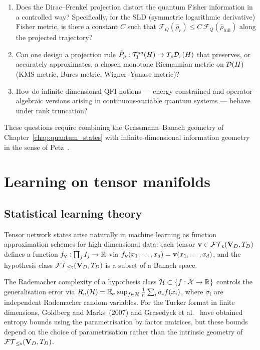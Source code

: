 \begin{problem}
\label{prob:lind:qfi}
\begin{enumerate}
\item[\textup{(a)}] Does the Dirac--Frenkel projection distort the
    quantum Fisher information in a controlled way? Specifically, for
    the SLD (symmetric logarithmic derivative) Fisher metric, is there
    a constant $C$ such that
    $\mathcal{F}_Q(\hat\rho_r) \leq C\,\mathcal{F}_Q(\hat\rho_{\mathrm{full}})$
    along the projected trajectory?
\item[\textup{(b)}] Can one design a projection rule
    $\hat P_\rho: \mathcal{T}_{1}^{sa}(H) \to T_\rho\mathcal{D}_{r}(H)$ that preserves,
    or accurately approximates, a chosen monotone Riemannian metric on
    $\mathcal{D}(H)$ (KMS metric, Bures metric, Wigner--Yanase metric)?
\item[\textup{(c)}] How do infinite-dimensional QFI notions —
    energy-constrained and operator-algebraic versions arising in
    continuous-variable quantum systems — behave under rank truncation?
\end{enumerate}
These questions require combining the Grassmann--Banach geometry of
Chapter~\ref{chap:quantum_states} with infinite-dimensional information
geometry in the sense of Petz~\cite{BratteliRobinson1987}.
\end{problem}

\section{Learning on tensor manifolds}
\label{sec:open:learning}

\subsection*{Statistical learning theory}

Tensor network states arise naturally in machine learning as function
approximation schemes for high-dimensional data: each tensor $\mathbf{v} \in
\mathcal{FT}_{\mathfrak{r}}(\mathbf{V}_D,T_D)$ defines a function $f_{\mathbf{v}}: \prod_j I_j \to \mathbb{R}$ via
$f_{\mathbf{v}}(x_1,\ldots,x_d) = \mathbf{v}(x_1,\ldots,x_d)$, and the hypothesis
class $\mathcal{FT}_{\leq \mathfrak{r}}(\mathbf{V}_D,T_D)$ is a subset of a Banach space.

The Rademacher complexity of a hypothesis class $\mathcal{H} \subset
\{f: \mathcal{X} \to \mathbb{R}\}$ controls the generalisation error via
$R_n(\mathcal{H}) = \mathbb{E}_\sigma \sup_{f \in \mathcal{H}} \frac{1}{n}
\sum_i \sigma_i f(x_i)$, where $\sigma_i$ are independent Rademacher
random variables. For the Tucker format in finite dimensions,
Goldberg and Marks~(2007) and Grasedyck et al.~\cite{Grasedyck2013}
have obtained entropy bounds using the parametrisation by factor
matrices, but these bounds depend on the choice of parametrisation
rather than the intrinsic geometry of $\mathcal{FT}_{\leq \mathfrak{r}}(\mathbf{V}_D,T_D)$.

